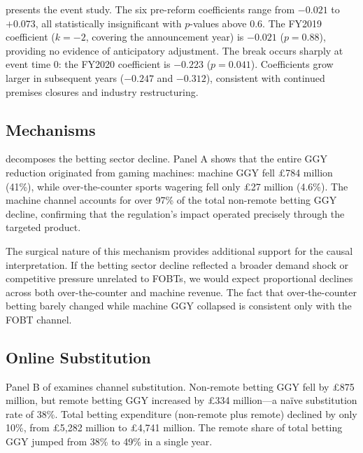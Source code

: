 \documentclass[12pt]{article}
\begin{document}


 presents the event study. The six pre-reform coefficients range from $-0.021$ to $+0.073$, all statistically insignificant with $p$-values above 0.6. The FY2019 coefficient ($k = -2$, covering the announcement year) is $-0.021$ ($p = 0.88$), providing no evidence of anticipatory adjustment. The break occurs sharply at event time 0: the FY2020 coefficient is $-0.223$ ($p = 0.041$). Coefficients grow larger in subsequent years ($-0.247$ and $-0.312$), consistent with continued premises closures and industry restructuring.

\subsection{Mechanisms}



 decomposes the betting sector decline. Panel A shows that the entire GGY reduction originated from gaming machines: machine GGY fell \pounds 784 million (41\%), while over-the-counter sports wagering fell only \pounds 27 million (4.6\%). The machine channel accounts for over 97\% of the total non-remote betting GGY decline, confirming that the regulation's impact operated precisely through the targeted product.

The surgical nature of this mechanism provides additional support for the causal interpretation. If the betting sector decline reflected a broader demand shock or competitive pressure unrelated to FOBTs, we would expect proportional declines across both over-the-counter and machine revenue. The fact that over-the-counter betting barely changed while machine GGY collapsed is consistent only with the FOBT channel.

\subsection{Online Substitution}

Panel B of  examines channel substitution. Non-remote betting GGY fell by \pounds 875 million, but remote betting GGY increased by \pounds 334 million---a na\"ive substitution rate of 38\%. Total betting expenditure (non-remote plus remote) declined by only 10\%, from \pounds 5,282 million to \pounds 4,741 million. The remote share of total betting GGY jumped from 38\% to 49\% in a single year.
\end{document}
